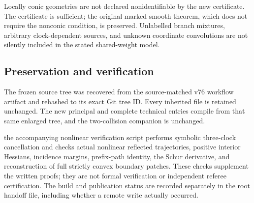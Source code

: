 \documentclass[
  11pt,
]{article}
\begin{document}
Locally conic geometries are not declared nonidentifiable by the new
certificate. The certificate is sufficient; the original marked smooth
theorem, which does not require the nonconic condition, is preserved.
Unlabelled branch mixtures, arbitrary clock-dependent sources, and
unknown coordinate convolutions are not silently included in the stated
shared-weight model.

\subsection{Preservation and
verification}\label{preservation-and-verification}

The frozen source tree was recovered from the source-matched v76
workflow artifact and rehashed to its exact Git tree ID. Every inherited
file is retained unchanged. The new principal and complete technical
entries compile from that same enlarged tree, and the two-collision
companion is unchanged.

the accompanying nonlinear verification script performs symbolic
three-clock cancellation and checks actual nonlinear reflected
trajectories, positive interior Hessians, incidence margins, prefix-path
identity, the Schur derivative, and reconstruction of full strictly
convex boundary patches. These checks supplement the written proofs;
they are not formal verification or independent referee certification.
The build and publication status are recorded separately in the root
handoff file, including whether a remote write actually occurred.
\end{document}
